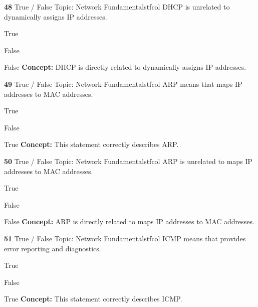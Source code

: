 \documentclass[10pt,a4paper]{article}
\begin{document}
\begin{qcard}{\color{white}\textbf{48} \hfill \small True / False \textbar{} Topic: Network Fundamentals}{tfcol}
DHCP is unrelated to dynamically assigns IP addresses.

\begin{qoptions}
\item True
\item False
\end{qoptions}
\begin{explainbox}{False}
\textbf{Concept:} DHCP is directly related to dynamically assigns IP addresses.
\end{explainbox}
\end{qcard}

\begin{qcard}{\color{white}\textbf{49} \hfill \small True / False \textbar{} Topic: Network Fundamentals}{tfcol}
ARP means that maps IP addresses to MAC addresses.

\begin{qoptions}
\item True
\item False
\end{qoptions}
\begin{explainbox}{True}
\textbf{Concept:} This statement correctly describes ARP.
\end{explainbox}
\end{qcard}

\begin{qcard}{\color{white}\textbf{50} \hfill \small True / False \textbar{} Topic: Network Fundamentals}{tfcol}
ARP is unrelated to maps IP addresses to MAC addresses.

\begin{qoptions}
\item True
\item False
\end{qoptions}
\begin{explainbox}{False}
\textbf{Concept:} ARP is directly related to maps IP addresses to MAC addresses.
\end{explainbox}
\end{qcard}

\begin{qcard}{\color{white}\textbf{51} \hfill \small True / False \textbar{} Topic: Network Fundamentals}{tfcol}
ICMP means that provides error reporting and diagnostics.

\begin{qoptions}
\item True
\item False
\end{qoptions}
\begin{explainbox}{True}
\textbf{Concept:} This statement correctly describes ICMP.
\end{explainbox}
\end{qcard}
\end{document}
